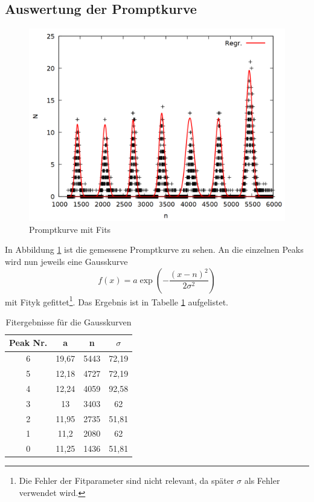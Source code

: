 \subsection{Auswertung der Promptkurve}


\begin{figure}
\centering
\includegraphics[width=0.7\linewidth]{data/prompt2.png}
\caption{Promptkurve mit Fits}
\label{fig:prompt2}
\end{figure}

In Abbildung \ref{fig:prompt2} ist die gemessene Promptkurve zu sehen. An die einzelnen Peaks wird nun jeweils eine Gausskurve \[f(x) = a\exp{\left(-\frac{(x-n)^2}{2\sigma^2}\right)}\]mit Fityk gefittet\footnote{Die Fehler der Fitparameter sind nicht relevant, da später $\sigma$ als Fehler verwendet wird.}. Das Ergebnis ist in Tabelle \ref{tab:prompt} aufgelistet.

\begin{table}
\centering
\caption{Fitergebnisse für die Gausskurven}
\begin{tabular}{cccc}
\toprule
Peak Nr. & a & n & $\sigma$\\
\midrule
6&	19,67&	5443&	72,19\\
5&	12,18&	4727&	72,19\\
4&	12,24&	4059&	92,58\\
3&	13&	3403&	62\\
2&	11,95&	2735&	51,81\\
1&	11,2&	2080&	62\\
0&	11,25&	1436&	51,81\\
\bottomrule
\end{tabular}
\label{tab:prompt}
\end{table}

